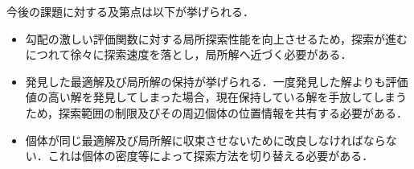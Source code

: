 \documentclass[a4j,11pt]{jarticle}
\def\proposed{DNRBA}
\begin{document}
今後の課題に対する及第点は以下が挙げられる．
\begin{itemize}
  \item 勾配の激しい評価関数に対する局所探索性能を向上させるため，探索が進むにつれて徐々に探索速度を落とし，局所解へ近づく必要がある．
  \item 発見した最適解及び局所解の保持が挙げられる．一度発見した解よりも評価値の高い解を発見してしまった場合，現在保持している解を手放してしまうため，探索範囲の制限及びその周辺個体の位置情報を共有する必要がある．
  \item 個体が同じ最適解及び局所解に収束させないために改良しなければならない．これは個体の密度等によって探索方法を切り替える必要がある．
\end{itemize}
\end{document}
